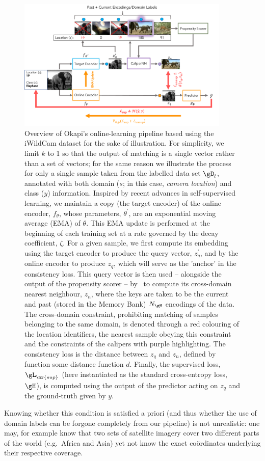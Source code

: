 \begin{figure}[ht]
  \centering
  \includegraphics[width=0.9\textwidth]{figures/ol_pipe_new_new.pdf}
  \caption{
  Overview of Okapi's online-learning pipeline based using the iWildCam dataset for the sake of
  illustration.
  For simplicity, we limit $k$ to 1 so that the output of matching is a single vector rather than a
  set of vectors; for the same reason we illustrate the process for only a single sample taken from
  the labelled data set $\gD_l$, annotated with both domain ($s$; in this case, \emph{camera
  location}) and class ($y$) information.
  Inspired by recent advances in self-supervised learning, we maintain a copy (the target encoder)
  of the online encoder, $f_\theta$, whose parameters, $\theta^\prime$, are an exponential moving
  average (EMA) of $\theta$. 
  This EMA update is performed at the beginning of each training set at a rate governed by the
  decay coefficient, $\zeta$. 
  For a given sample, we first compute its embedding using the target encoder to produce the query
  vector, $z_q^\prime$, and by the online encoder to produce $z_q$, which will serve as the
  'anchor' in the consistency loss. 
  This query vector is then used -- alongside the output of the propensity scorer -- by \CNN\ to
  compute its cross-domain nearest neighbour, $z_n$, where the keys are taken to be the current and
  past (stored in the Memory Bank) $N_\gM$ encodings of the data.
  The cross-domain constraint, prohibiting matching of samples belonging to the same domain, is
  denoted through a red colouring of the location identifiers, the nearest sample obeying this
  constraint and the constraints of the calipers with purple highlighting.
  The consistency loss is the distance between $z_q$ and $z_n$, defined by function some distance
  function $d$. 
  Finally, the supervised loss, $\gL_\mr{sup}$ (here instantiated as the standard cross-entropy
  loss, $\gH$), is computed using the output of the predictor acting on $z_q$ and the ground-truth
  given by $y$.
%
  }
  \label{fig:okapi-pipeline}
\end{figure}
%
Knowing whether this condition is satisfied a priori (and thus whether the use of domain labels can
be forgone completely from our pipeline) is not unrealistic: one may, for example know that two
sets of satellite imagery cover two different parts of the world (e.g.\ Africa and Asia) yet not
know the exact co{\"o}rdinates underlying their respective coverage.
